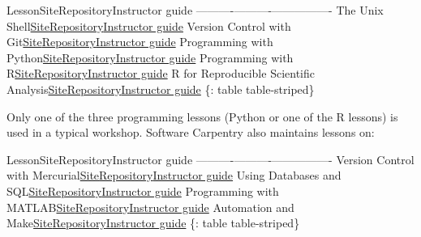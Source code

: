 \textbar{}Lesson\textbar{}Site\textbar{}Repository\textbar{}Instructor
guide\textbar{}
\textbar{}------\textbar{}----\textbar{}----------\textbar{}----------------\textbar{}
\textbar{}The Unix
Shell\textbar{}\href{\{\{site.swc\_pages\}\}/shell-novice/}{Site}\textbar{}\href{https://github.com/swcarpentry/shell-novice}{Repository}\textbar{}\href{\{\{site.swc\_pages\}\}/shell-novice/guide/}{Instructor
guide} \textbar{}Version Control with
Git\textbar{}\href{\{\{site.swc\_pages\}\}/git-novice/}{Site}\textbar{}\href{https://github.com/swcarpentry/git-novice}{Repository}\textbar{}\href{\{\{site.swc\_pages\}\}/git-novice/guide/}{Instructor
guide}\textbar{} \textbar{}Programming with
Python\textbar{}\href{\{\{site.swc\_pages\}\}/python-novice-inflammation/}{Site}\textbar{}\href{https://github.com/swcarpentry/python-novice-inflammation}{Repository}\textbar{}\href{\{\{site.swc\_pages\}\}/python-novice-inflammation/guide/}{Instructor
guide}\textbar{} \textbar{}Programming with
R\textbar{}\href{\{\{site.swc\_pages\}\}/r-novice-inflammation/}{Site}\textbar{}\href{https://github.com/swcarpentry/r-novice-inflammation}{Repository}\textbar{}\href{\{\{site.swc\_pages\}\}/r-novice-inflammation/guide/}{Instructor
guide}\textbar{} \textbar{}R for Reproducible Scientific
Analysis\textbar{}\href{\{\{site.swc\_pages\}\}/r-novice-gapminder/}{Site}\textbar{}\href{https://github.com/swcarpentry/r-novice-gapminder}{Repository}\textbar{}\href{\{\{site.swc\_pages\}\}/r-novice-gapminder/guide/}{Instructor
guide}\textbar{} \{: table table-striped\}

Only one of the three programming lessons (Python or one of the R
lessons) is used in a typical workshop. Software Carpentry also
maintains lessons on:

\textbar{}Lesson\textbar{}Site\textbar{}Repository\textbar{}Instructor
guide\textbar{}
\textbar{}------\textbar{}----\textbar{}----------\textbar{}----------------\textbar{}
\textbar{}Version Control with
Mercurial\textbar{}\href{\{\{site.swc\_pages\}\}/hg-novice/}{Site}\textbar{}\href{https://github.com/swcarpentry/hg-novice}{Repository}\textbar{}\href{\{\{site.swc\_pages\}\}/hg-novice/guide/}{Instructor
guide} \textbar{}Using Databases and
SQL\textbar{}\href{\{\{site.swc\_pages\}\}/sql-novice-survey/}{Site}\textbar{}\href{https://github.com/swcarpentry/sql-novice-survey}{Repository}\textbar{}\href{\{\{site.swc\_pages\}\}/sql-novice-survey/guide/}{Instructor
guide} \textbar{}Programming with
MATLAB\textbar{}\href{\{\{site.swc\_pages\}\}/matlab-novice-inflammation/}{Site}\textbar{}\href{https://github.com/swcarpentry/matlab-novice-inflammation}{Repository}\textbar{}\href{\{\{site.swc\_pages\}\}/matlab-novice-inflammation/guide/}{Instructor
guide} \textbar{}Automation and
Make\textbar{}\href{\{\{site.swc\_pages\}\}/make-novice/}{Site}\textbar{}\href{https://github.com/swcarpentry/make-novice}{Repository}\textbar{}\href{\{\{site.swc\_pages\}\}/make-novice/guide/}{Instructor
guide} \{: table table-striped\}

